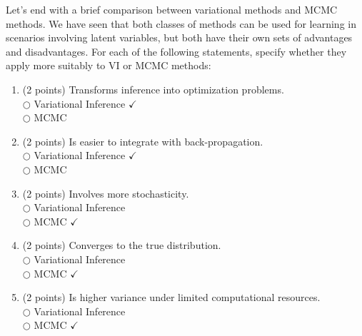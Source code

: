 \documentclass[a3paper,12pt]{extarticle} %
\begin{document}
Let’s end with a brief comparison between variational methods and MCMC methods. We have seen that both
classes of methods can be used for learning in scenarios involving latent variables, but both have their own sets of
advantages and disadvantages. For each of the following statements, specify whether they apply more suitably to
VI or MCMC methods:

\begin{enumerate}
    \item (2 points) Transforms inference into optimization problems.\\
    \(\bigcirc\) Variational Inference \(\checkmark\) \\
    \(\bigcirc\) MCMC
    \item (2 points) Is easier to integrate with back-propagation.\\
    \(\bigcirc\) Variational Inference \(\checkmark\) \\
    \(\bigcirc\) MCMC
    \item (2 points) Involves more stochasticity.\\
    \(\bigcirc\) Variational Inference \\
    \(\bigcirc\) MCMC \(\checkmark\)
    \item (2 points) Converges to the true distribution.\\
    \(\bigcirc\) Variational Inference \\
    \(\bigcirc\) MCMC \(\checkmark\)
    \item (2 points) Is higher variance under limited computational resources.\\
    \(\bigcirc\) Variational Inference  \\
    \(\bigcirc\) MCMC \(\checkmark\)
\end{enumerate}
\end{document}
